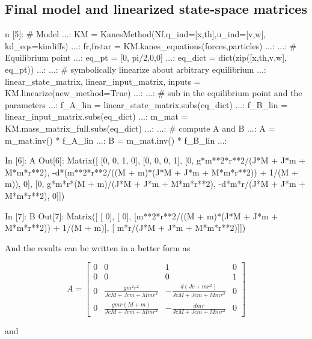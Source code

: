 \subsection{Final model and linearized state-space matrices}
\begin{code}
n [5]: # Model
   ...: KM = KanesMethod(Nf,q_ind=[x,th],u_ind=[v,w], kd_eqs=kindiffs)
   ...: fr,frstar = KM.kanes_equations(forces,particles)
   ...: 
   ...: # Equilibrium point
   ...: eq_pt = [0, pi/2,0,0]
   ...: eq_dict = dict(zip([x,th,v,w], eq_pt))
   ...: 
   ...: # symbolically linearize about arbitrary equilibrium
   ...: linear_state_matrix, linear_input_matrix, inputs = 
KM.linearize(new_method=True)
   ...: 
   ...: # sub in the equilibrium point and the parameters
   ...: f_A_lin = linear_state_matrix.subs(eq_dict)
   ...: f_B_lin = linear_input_matrix.subs(eq_dict)
   ...: m_mat = KM.mass_matrix_full.subs(eq_dict)
   ...: 
   ...: # compute A and B
   ...: A = m_mat.inv() * f_A_lin
   ...: B = m_mat.inv() * f_B_lin
   ...: 
\end{code}

\begin{code}
In [6]: A
Out[6]: 
Matrix([
[0,  0,  1, 0],
[0,  0,  0, 1],
[0,   g*m**2*r**2/(J*M + J*m + M*m*r**2), -d*(m**2*r**2/((M + m)*(J*M + J*m 
+ M*m*r**2)) + 1/(M + m)), 0],
[0, g*m*r*(M + m)/(J*M + J*m + M*m*r**2),                               
-d*m*r/(J*M + J*m + M*m*r**2), 0]])
\end{code}

\begin{code}
In [7]: B
Out[7]: 
Matrix([
[                                                       0],
[                                                       0],
[m**2*r**2/((M + m)*(J*M + J*m + M*m*r**2)) + 1/(M + m)],
[                            m*r/(J*M + J*m + M*m*r**2)]])
\end{code}

And the results can be written in a better form as

$$
A=\left[\begin{matrix}0 & 0 & 1 & 0\\0 & 0 & 0 & 1\\0 & \frac{g m^{2} r^{2}}{Jc 
M + Jc m + M m r^{2}} & - \frac{d \left(Jc + m r^{2}\right)}{Jc M + Jc m + M m 
r^{2}} & 0\\0 & \frac{g m r \left(M + m\right)}{Jc M + Jc m + M m r^{2}} & - 
\frac{d m r}{Jc M + Jc m + M m r^{2}} & 0\end{matrix}\right]
$$

and 

